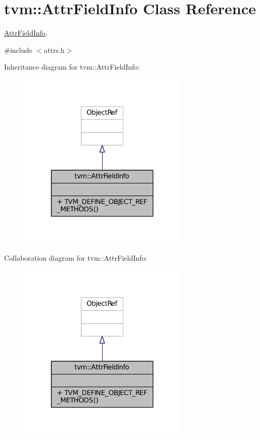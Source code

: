 \hypertarget{classtvm_1_1AttrFieldInfo}{}\section{tvm\+:\+:Attr\+Field\+Info Class Reference}
\label{classtvm_1_1AttrFieldInfo}


\hyperlink{classtvm_1_1AttrFieldInfo}{Attr\+Field\+Info}.  




{\ttfamily \#include $<$attrs.\+h$>$}



Inheritance diagram for tvm\+:\+:Attr\+Field\+Info\+:
\nopagebreak
\begin{figure}[H]
\begin{center}
\leavevmode
\includegraphics[width=230pt]{classtvm_1_1AttrFieldInfo__inherit__graph}
\end{center}
\end{figure}


Collaboration diagram for tvm\+:\+:Attr\+Field\+Info\+:
\nopagebreak
\begin{figure}[H]
\begin{center}
\leavevmode
\includegraphics[width=230pt]{classtvm_1_1AttrFieldInfo__coll__graph}
\end{center}
\end{figure}
